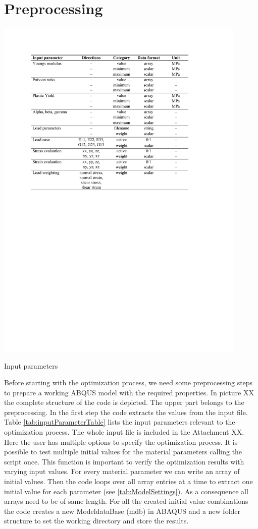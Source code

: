     \section{Preprocessing} \label{sec: preprocessing}

    \begin{table}[H]
		\centering
        \includegraphics[width=0.9\textwidth]{inputParameterTable.pdf}
		\caption{Input parameters}
		\label{tab:inputParameterTable}
	\end{table}
    
    Before starting with the optimization process, we need some preprocessing steps to prepare a working ABQUS model with the required properties. In picture XX the complete structure of the code is depicted. The upper part belongs to the preprocessing. In the first step the code extracts the values from the input file. Table \autoref{tab:inputParameterTable} lists the input parameters relevant to the optimization process. The whole input file is included in the Attachment XX. Here the user has multiple options to specify the optimization process. It is possible to test multiple initial values for the material parameters calling the script once. This function is important to verify the optimization results with varying input values. For every material parameter we can write an array of initial values. Then the code loops over all array entries at a time to extract one initial value for each parameter (see \autoref{tab:ModelSettings}). As a consequence all arrays need to be of same length. For all the created initial value combinations the code creates a new ModeldataBase (mdb) in ABAQUS and a new folder structure to set the working directory and store the results.
    
